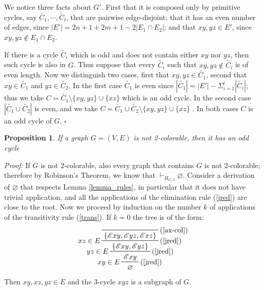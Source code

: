 \documentclass[a4paper,12pt,oneside]{book}
\newtheorem{proposition}[theorem]{Proposition}
\newcommand{\E}{\mathscr{E}}
\newcommand*{\QED}{\hfill\ensuremath{\square}}
\let\emptyset\varnothing
\begin{document}
We notice three facts about $G'$. First that it is composed only by primitive cycles, say $\tilde{C_1},\cdots,\tilde{C_l}$, that are pairwise edge-disjoint; that it has an even number of edges, since $|E'|=2n+1+2m+1-2|E_1\cap E_2|$; and that $xy,yz\in E'$, since $xy,yz\notin E_1\cap E_2$.

If there is a cycle $\tilde{C_i}$ which is odd and does not contain either $xy$ nor $yz$, then such cycle is also in $G$. 
Thus suppose that every $\tilde{C_i}$ such that $xy,yz\notin \tilde{C_i}$ is of even length. 
Now we distinguish two cases, first that  $xy,yz\in\tilde{C_1}$, second that $xy\in\tilde{C_1}$ and $yz\in\tilde{C_2}$. 
In the first case $\tilde{C_1}$ is even since $|\tilde{C_1}|=|E'|-\Sigma_{i=1}^l |\tilde{C_i}|$; thus we take $C=\tilde{C_1}\setminus\{xy,yz\}\cup\{xz\}$ which is an odd cycle.
In the second case $|\tilde{C_1}\cup\tilde{C_2}|$ is even, and we take $C=\tilde{C_1}\cup\tilde{C_2}\setminus\{xy,yz\}\cup\{xz\}$ . In both cases $C$ is an odd cycle of $G$. \QED\newpage


\begin{proposition} \label{mio}
If a graph $G=(V,E)$ is not 2-colorable, then it has an odd cycle
\end{proposition}
\textit{Proof:}
If $G$ is not 2-colorable, also every graph that contains $G$ is not 2-colorable; therefore by Robinson's Theorem, we know that  $\vdash_{H_{G,2}} \emptyset$. Consider a derivation of $\emptyset$  that respects Lemma \ref{lemma_rules}, in particular that it does not have trivial application, and all the applications of the elimination rule (\ref{jred}) are close to the root.
Now we proceed by induction on the number $k$ of applications of the transitivity rule (\ref{trans}).
If $k=0$ the tree is of the form:
\begin{eqnarray*}
\prftree[r,l]{(\ref{jred})}{$xy \in E$}{
\prftree[r,l]{(\ref{jred})}{$yz \in E$}{
\prftree[r,l]{(\ref{jred})}{$xz \in E$}{
\prftree[r]{(\ref{ax-col})} { }{ \{ \E xy , \E yz, \E xz  \} } } 
{\{ \E xy , \E yz \} } } 
{ \E xy  } }
{ \emptyset }
\end{eqnarray*}
Then $xy,xz,yz \in E$ and the 3-cycle $xyz$ is a subgraph of $G$.
 
\end{document}
